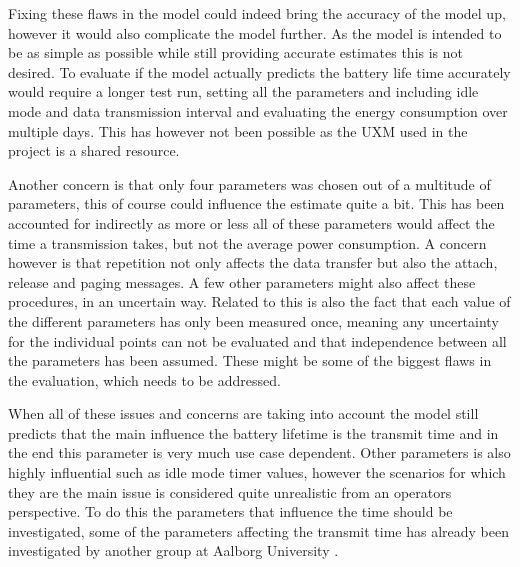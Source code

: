 Fixing these flaws in the model could indeed bring the accuracy of the model up, however it would also complicate the model further. As the model is intended to be as simple as possible while still providing accurate estimates this is not desired. To evaluate if the model actually predicts the battery life time accurately would require a longer test run, setting all the parameters and including idle mode and data transmission interval and evaluating the energy consumption over multiple days. This has however not been possible as the UXM used in the project is a shared resource. 

Another concern is that only four parameters was chosen out of a multitude of parameters, this of course could influence the estimate quite a bit. This has been accounted for indirectly as more or less all of these parameters would affect the time a transmission takes, but not the average power consumption. A concern however is that repetition not only affects the data transfer but also the attach, release and paging messages. A few other parameters might also affect these procedures, in an uncertain way. Related to this is also the fact that each value of the different parameters has only been measured once, meaning any uncertainty for the individual points can not be evaluated and that independence between all the parameters has been assumed. These might be some of the biggest flaws in the evaluation, which needs to be addressed.

When all of these issues and concerns are taking into account the model still predicts that the main influence the battery lifetime is the transmit time and in the end this parameter is very much use case dependent. Other parameters is also highly influential such as idle mode timer values, however the scenarios for which they are the main issue is considered quite unrealistic from an operators perspective. To do this the parameters that influence the time should be investigated, some of the parameters affecting the transmit time has already been investigated by another group at Aalborg University .



